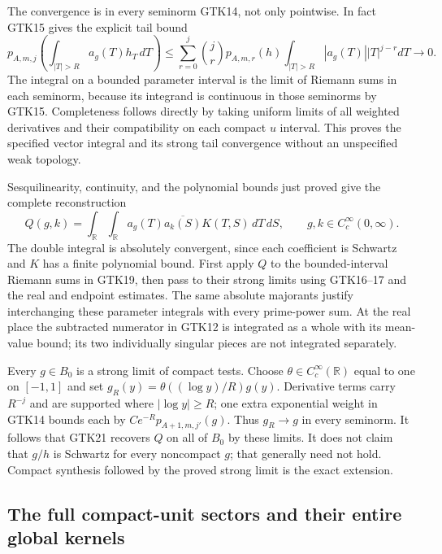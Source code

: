 The convergence is in every seminorm GTK14, not only
pointwise. In fact GTK15 gives the explicit tail bound
\begin{equation}\tag{GTK20}
 p_{A,m,j}\left(\int_{|T|>R}a_g(T)h_T\,dT\right)
 \le\sum_{r=0}^j {j\choose r}p_{A,m,r}(h)
           \int_{|T|>R}|a_g(T)||T|^{j-r}dT
        \longrightarrow0 .
\end{equation}
The integral on a bounded parameter interval is the limit
of Riemann sums in each seminorm, because its integrand is
continuous in those seminorms by GTK15. Completeness follows
directly by taking uniform limits of all weighted derivatives
and their compatibility on each compact $u$ interval.
This proves the specified vector integral and its strong
tail convergence without an unspecified weak topology.

Sesquilinearity, continuity, and the polynomial bounds just
proved give the complete reconstruction
\begin{equation}\tag{GTK21}
 Q(g,k)=\int_{\mathbb R}\int_{\mathbb R}
        a_g(T)\overline{a_k(S)}K(T,S)\,dT\,dS,
              \qquad g,k\in C_c^\infty(0,\infty).
\end{equation}
The double integral is absolutely convergent, since each
coefficient is Schwartz and $K$ has a finite polynomial
bound. First apply $Q$ to the bounded-interval Riemann sums
in GTK19, then pass to their strong limits using GTK16--17
and the real and endpoint estimates. The same absolute
majorants justify interchanging these parameter integrals
with every prime-power sum. At the real place the subtracted
numerator in GTK12 is integrated as a whole with its
mean-value bound; its two individually singular pieces are
not integrated separately.

Every $g\in B_0$ is a strong limit of compact tests. Choose
$\theta\in C_c^\infty(\mathbb R)$ equal to one on $[-1,1]$
and set $g_R(y)=\theta((\log y)/R)g(y)$. Derivative terms
carry $R^{-j}$ and are supported where $|\log y|\ge R$;
one extra exponential weight in GTK14 bounds each by
$C e^{-R}p_{A+1,m,j'}(g)$. Thus $g_R\to g$ in every
seminorm. It follows that GTK21 recovers $Q$ on all of
$B_0$ by these limits. It does not claim that $g/h$ is
Schwartz for every noncompact $g$; that generally need
not hold. Compact synthesis followed by the proved
strong limit is the exact extension.

\subsection{The full compact-unit sectors and their entire global kernels}

